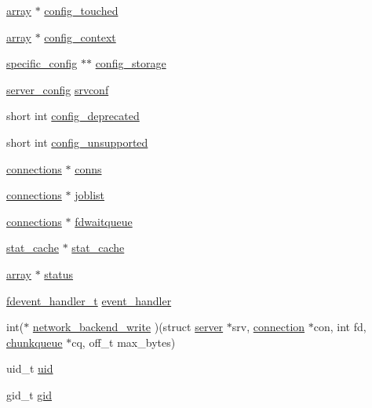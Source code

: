 \begin{DoxyCompactItemize}
\item 
\hyperlink{structarray}{array} $\ast$ \hyperlink{structserver_a8351f042986b88eb888d85d085758020}{config\-\_\-touched}
\item 
\hyperlink{structarray}{array} $\ast$ \hyperlink{structserver_a134a4c19a77a4520eed497c021bb84ab}{config\-\_\-context}
\item 
\hyperlink{structspecific__config}{specific\-\_\-config} $\ast$$\ast$ \hyperlink{structserver_aed6e10a38f54615b4c7cca2468e77765}{config\-\_\-storage}
\item 
\hyperlink{structserver__config}{server\-\_\-config} \hyperlink{structserver_a4cea52b35e252e24d75e3a298a0146e6}{srvconf}
\item 
short int \hyperlink{structserver_aef7fed0187e9b4f287cdbe799809bd08}{config\-\_\-deprecated}
\item 
short int \hyperlink{structserver_a643555f00863a80ecf48eaa207483286}{config\-\_\-unsupported}
\item 
\hyperlink{structconnections}{connections} $\ast$ \hyperlink{structserver_aae05a2998939a5cf7fcf995f1fe4e413}{conns}
\item 
\hyperlink{structconnections}{connections} $\ast$ \hyperlink{structserver_a52958de6c5ef6863634feaa2c4ea3771}{joblist}
\item 
\hyperlink{structconnections}{connections} $\ast$ \hyperlink{structserver_ae3bb6b0e7e6984234ebc472709389f75}{fdwaitqueue}
\item 
\hyperlink{structstat__cache}{stat\-\_\-cache} $\ast$ \hyperlink{structserver_aaa23f868ab71654b419a5ab8e8e61b46}{stat\-\_\-cache}
\item 
\hyperlink{structarray}{array} $\ast$ \hyperlink{structserver_a0c01038b8f323d870c319386b35a4b54}{status}
\item 
\hyperlink{fdevent_8h_a7a31a5c15ba485676406291b6298e9a1}{fdevent\-\_\-handler\-\_\-t} \hyperlink{structserver_abaae431ce1ccad32f1da78a9510de350}{event\-\_\-handler}
\item 
int($\ast$ \hyperlink{structserver_a70b0be520b7b3dbf881c52749b380fc9}{network\-\_\-backend\-\_\-write} )(struct \hyperlink{structserver}{server} $\ast$srv, \hyperlink{structconnection}{connection} $\ast$con, int fd, \hyperlink{structchunkqueue}{chunkqueue} $\ast$cq, off\-\_\-t max\-\_\-bytes)
\item 
uid\-\_\-t \hyperlink{structserver_a2ccaa2dbbc269d6156bfb5685ee86870}{uid}
\item 
gid\-\_\-t \hyperlink{structserver_af10386864ac44f42312414eb542fbd6e}{gid}
\end{DoxyCompactItemize}


